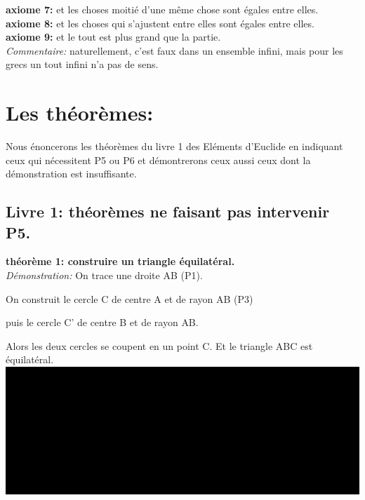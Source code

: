 \documentclass[a4paper, 12pt, twoside]{book}
\begin{document}
\textbf{axiome 7:} et les choses moitié d'une même chose sont égales entre elles.\\

\textbf{axiome 8:} et les choses qui s'ajustent entre elles sont égales entre elles.\\
 
 \textbf{axiome 9:} et le tout est plus grand que la partie.\\
 
\textit{Commentaire:} naturellement, c'est faux dans un ensemble infini, mais pour les grecs un tout infini n'a pas de sens. \\



\section{Les théorèmes:}

Nous énoncerons les théorèmes du livre 1 des Eléments d'Euclide en indiquant ceux qui nécessitent P5 ou P6 et démontrerons ceux aussi ceux dont la démonstration est insuffisante.\\

\subsection{Livre 1: théorèmes ne faisant pas intervenir P5.}


\textbf{théorème 1: construire un triangle équilatéral.}\\

\textit{Démonstration:} On trace une droite AB (P1).\

 On construit le cercle C de centre A et de rayon AB (P3)\
 
  puis le cercle C' de centre B et de rayon AB.\

Alors les deux cercles se coupent en un point C. Et le triangle ABC est équilatéral.\\

\includegraphics[scale=0.2]{figures/th1.eps}\\ 
\end{document}
